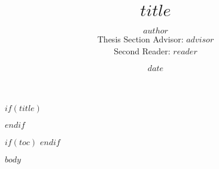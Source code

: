 \documentclass[12pt]{article}
\begin{document}
$if(title)$
\title{$title$}
\author{$author$\\ \vspace{0.5cm} \normalsize{Thesis Section Advisor: $advisor$} \\ \normalsize{Second Reader: $reader$}}
\date{$date$}
\maketitle
\newpage
$endif$

$if(toc)$
\tableofcontents
\newpage
$endif$

$body$
\end{document}
